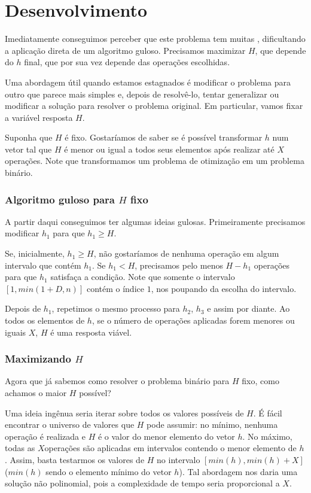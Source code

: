 \section{Desenvolvimento}

Imediatamente conseguimos perceber que este problema tem muitas , dificultando a aplicação direta de um algoritmo guloso. Precisamos maximizar $H$, que depende do $h$ final, que por sua vez depende das operações escolhidas.

Uma abordagem útil quando estamos estagnados é modificar o problema para outro que parece mais simples e, depois de resolvê-lo, tentar generalizar ou modificar a solução para resolver o problema original. Em particular, vamos fixar a variável resposta $H$.

Suponha que $H$ é fixo. Gostaríamos de saber se é possível transformar $h$ num vetor tal que $H$ é menor ou igual a todos seus elementos após realizar até $X$ operações. Note que transformamos um problema de otimização em um problema binário.

\subsubsection*{Algoritmo guloso para $H$ fixo}\label{subproblema:algo}

A partir daqui conseguimos ter algumas ideias gulosas. Primeiramente precisamos modificar $h_1$ para que $h_1 \geq H$.

Se, inicialmente, $h_1 \geq H$, não gostaríamos de  nenhuma operação em algum intervalo que contém $h_1$. Se $h_1 < H$, precisamos pelo menos $H - h_1$ operações para que $h_1$ satisfaça a condição. Note que somente o intervalo $[1, min(1 + D, n)]$ contém o índice $1$, nos poupando da escolha do intervalo.

Depois de  $h_1$, repetimos o mesmo processo para $h_2$, $h_3$ e assim por diante. Ao  todos os elementos de $h$, se o número de operações aplicadas forem menores ou iguais $X$, $H$ é uma resposta viável.

\subsubsection*{Maximizando $H$}

Agora que já sabemos como resolver o problema binário para $H$ fixo, como achamos o maior $H$ possível?

Uma ideia ingênua seria iterar sobre todos os valores possíveis de $H$. É fácil encontrar o universo de valores que $H$ pode assumir: no mínimo, nenhuma operação é realizada e $H$ é o valor do menor elemento do vetor $h$. No máximo, todas as $X$operações são aplicadas em intervalos contendo o menor elemento de $h$. Assim, basta testarmos os valores de $H$ no intervalo $[min(h), min(h) + X]$ ($min(h)$ sendo o elemento mínimo do vetor $h$). Tal abordagem nos daria uma solução não polinomial, pois a complexidade de tempo seria proporcional a $X$.


